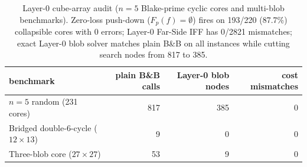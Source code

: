 \begin{table}[h]\centering\small
\caption{Layer-0 cube-array audit ($n=5$ Blake-prime cyclic cores and multi-blob benchmarks). Zero-loss push-down ($F_p(f)=\emptyset$) fires on 193/220 (87.7\%) collapsible cores with 0 errors; Layer-0 Far-Side IFF has 0/2821 mismatches; exact Layer-0 blob solver matches plain B\&B on all instances while cutting search nodes from 817 to 385.}
\label{tab:layer0-blobs}
\begin{tabular}{lrrr}\hline
benchmark & plain B\&B calls & Layer-0 blob nodes & cost mismatches \\\hline
$n=5$ random (231 cores) & 817 & 385 & 0 \\
Bridged double-$6$-cycle ($12\times 13$) & 9 & 0 & 0 \\
Three-blob core ($27\times 27$) & 53 & 9 & 0 \\
\hline\end{tabular}\end{table}
